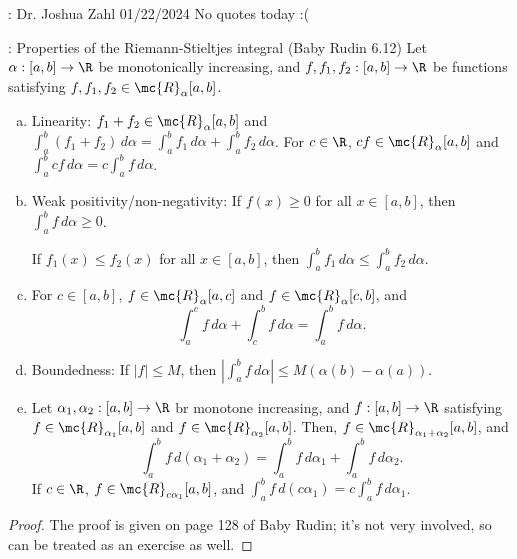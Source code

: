 \clearpage

\begin{nquote}{: Dr. Joshua Zahl 01/22/2024}
	No quotes today :(
\end{nquote}

\begin{ntheorem}{: Properties of the Riemann-Stieltjes integral (Baby Rudin 6.12)}
	Let \(\alpha:[a,b]\to\R\) be monotonically increasing, and \(f,f_1,f_2:[a,b]\to\R\) be functions satisfying \(f,f_1,f_2\in\mc{R}_{\alpha}[a,b]\).
	
	\begin{enumerate}[a)]
		\item Linearity: \(f_1+f_2\in\mc{R}_{\alpha}[a,b]\) and \(\displaystyle\int_a^b (f_1+f_2) \, d\alpha=\int_a^b f_1 \, d\alpha+\int_a^b f_2 \, d\alpha\). For \(c\in\R\), \(cf\in\mc{R}_{\alpha}[a,b]\) and \(\displaystyle\int_a^b cf \, d\alpha=c\int_a^b f \, d\alpha\).
		
		\item Weak positivity/non-negativity: If \(f(x)\geq 0\) for all \(x\in[a,b]\), then \(\displaystyle\int_a^b f \, d\alpha\geq 0\).
		
		\medskip
		
		If \(f_1(x)\leq f_2(x)\) for all \(x\in[a,b]\), then \(\displaystyle\int_a^b f_1 \, d\alpha\leq \int_a^b f_2 \, d\alpha\).
		
		\item For \(c\in[a,b]\), \(f\in\mc{R}_{\alpha}[a,c]\) and \(f\in\mc{R}_{\alpha}[c,b]\), and 
		\begin{equation*}
			\int_a^c f \, d\alpha+\int_c^b f \, d\alpha = \int_a^b f \, d\alpha.
		\end{equation*}
		
		\item Boundedness: If \(|f|\leq M\), then \(\displaystyle\left|\int_a^b f \, d\alpha\right|\leq M\left(\alpha(b)-\alpha(a)\right)\).
		
		\item Let \(\alpha_1,\alpha_2:[a,b]\to\R\) br monotone increasing, and \(f:[a,b]\to\R\) satisfying \(f\in\mc{R}_{\alpha_1}[a,b]\) and \(f\in\mc{R}_{\alpha_2}[a,b]\). Then, \(f\in\mc{R}_{\alpha_1+\alpha_2}[a,b]\), and 
		\begin{equation*}
			\int_a^b f \, d(\alpha_1+\alpha_2)=\int_a^b f \, d\alpha_1 + \int_a^b f \, d\alpha_2.
		\end{equation*}
		If \(c\in\R\), \(f\in\mc{R}_{c\alpha_1}[a,b]\), and \(\displaystyle\int_a^b f \, d(c\alpha_1)=c\int_a^b f \, d\alpha_1\).
	\end{enumerate}
\end{ntheorem}
\begin{proof}
	The proof is given on  page 128 of Baby Rudin; it's not very involved, so can be treated as an exercise as well.
\end{proof}

